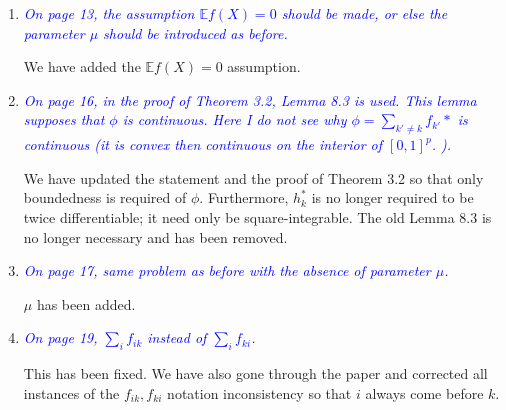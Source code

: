 \documentclass[pdftex,12pt]{article}
\def\E{{\mathbb E}}
\let\hat\widehat
\def\rc#1{{\it\textcolor{blue}{#1}}\smallskip}
\begin{document}
\begin{enumerate}

\item \rc{On page 13, the assumption $\E f(X) = 0$ should be made, or else the
parameter $\mu$ should be introduced as before.}

We have added the $\E f(X) = 0$ assumption.


\item \rc{On page 16, in the proof of Theorem 3.2, Lemma 8.3 is used. This
lemma supposes that $\phi$ is continuous. Here I do not see why $\phi =
\sum_{k'\neq k} f_{k'}*$ is continuous (it is convex then continuous on the interior of
$[0,1]^p$. ).}

We have updated the statement and the proof of Theorem 3.2 so that only boundedness is required of $\phi$. Furthermore, $h^*_k$ is no longer required to be twice differentiable; it need only be square-integrable. The old Lemma 8.3 is no longer necessary and has been removed. 

\item \rc{On page 17, same problem as before with the absence of parameter $\mu$.}

$\mu$ has been added.



\item \rc{On page 19, $\sum_{i} f_{ik}$ instead of $\sum_i
  f_{ki}$.}

This has been fixed. We have also gone through the paper and corrected all instances of the $f_{ik}, f_{ki}$ notation inconsistency so that $i$ always come before $k$.





\end{enumerate}
\end{document}
